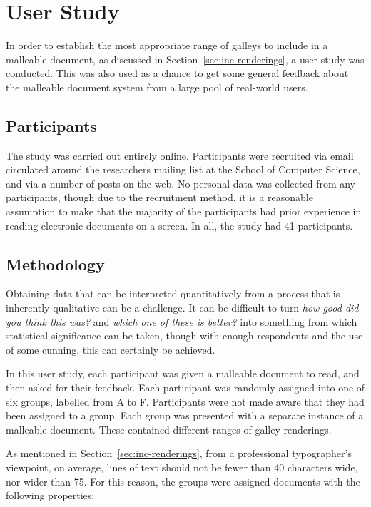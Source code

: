 \newpage
\section{User Study}
\label{sec:survey}
In order to establish the most appropriate range of galleys to include in a malleable document, as discussed in Section~\ref{sec:inc-renderings}, a user study was conducted. This was also used as a chance to get some general feedback about the malleable document system from a large pool of real-world users.

\subsection{Participants}
The study was carried out entirely online. Participants were recruited via email circulated around the researchers mailing list at the School of Computer Science, and via a number of posts on the web. No personal data was collected from any participants, though due to the recruitment method, it is a reasonable assumption to make that the majority of the participants had prior experience in reading electronic documents on a screen. In all, the study had 41 participants.

\subsection{Methodology}
Obtaining data that can be interpreted quantitatively from a process that is inherently qualitative can be a challenge. It can be difficult to turn \emph{how good did you think this was?} and \emph{which one of these is better?} into something from which statistical significance can be taken, though with enough respondents and the use of some cunning, this can certainly be achieved.

In this user study, each participant was given a malleable document to read, and then asked for their feedback. Each participant was randomly assigned into one of six groups, labelled from A to F. Participants were not made aware that they had been assigned to a group. Each group was presented with a separate instance of a malleable document. These contained different ranges of galley renderings.

As mentioned in Section~\ref{sec:inc-renderings}, from a professional typographer's viewpoint, on average, lines of text should not be fewer than 40 characters wide, nor wider than 75. For this reason, the groups were assigned documents with the following properties:

